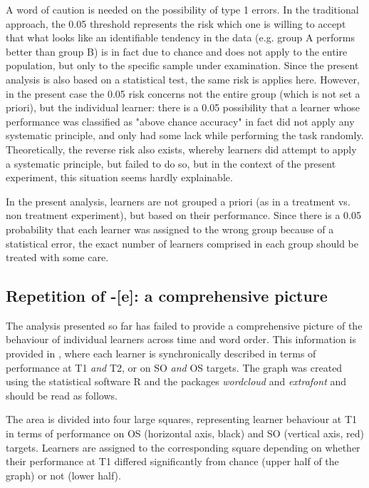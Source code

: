 A word of caution is needed on the possibility of type 1 errors. In the traditional approach, the 0.05 threshold represents the risk which one is willing to accept that what looks like an identifiable tendency in the data (e.g. group A performs better than group B) is in fact due to chance and does not apply to the entire population, but only to the specific sample under examination. Since the present analysis is also based on a statistical test, the same risk is applies here. However, in the present case the 0.05 risk concerns not the entire group (which is not set a priori), but the individual learner: there is a 0.05 possibility that a learner whose performance was classified as "above chance accuracy" in fact did not apply any systematic principle, and only had some lack while performing the task randomly. Theoretically, the reverse risk also exists, whereby learners did attempt to apply a systematic principle, but failed to do so, but in the context of the present experiment, this situation seems hardly explainable. 

In the present analysis, learners are not grouped a priori (as in a treatment vs. non treatment experiment), but based on their performance. Since there is a 0.05 probability that each learner was assigned to the wrong group because of a statistical error, the exact number of learners comprised in each group should be treated with some care.

\subsection{Repetition of -[e]: a comprehensive picture}\label{sec:04:2.4.1} %
The analysis presented so far has failed to provide a comprehensive picture of the behaviour of individual learners across time and word order. This information is provided in , where each learner is synchronically described in terms of performance at T1 \textit{and} T2, or on SO \textit{and} OS targets. The graph was created using the statistical software R \citep{RCoreTeam2017} and the packages \textit{wordcloud} \citep{Fellows2014} and \textit{extrafont} \citep{Chang2014} and should be read as follows.

The area is divided into four large squares, representing learner behaviour at T1 in terms of performance on OS (horizontal axis, black) and SO (vertical axis, red) targets. Learners are assigned to the corresponding square depending on whether their performance at T1 differed significantly from chance (upper half of the graph) or not (lower half). 

